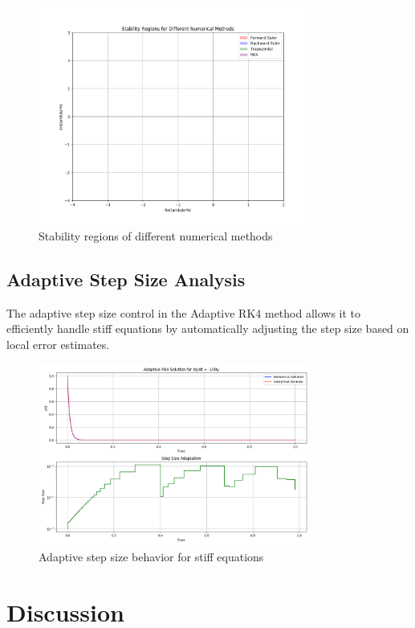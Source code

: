 \documentclass[11pt,a4paper]{article}
\begin{document}
\begin{figure}[H]
    \centering
    \includegraphics[width=0.8\textwidth]{stability_regions.png}
    \caption{Stability regions of different numerical methods}
    \label{fig:stability}
\end{figure}

\subsection{Adaptive Step Size Analysis}

The adaptive step size control in the Adaptive RK4 method allows it to efficiently handle stiff equations by automatically adjusting the step size based on local error estimates.

\begin{figure}[H]
    \centering
    \includegraphics[width=0.8\textwidth]{adaptive_step_size.png}
    \caption{Adaptive step size behavior for stiff equations}
    \label{fig:adaptive_step}
\end{figure}

\section{Discussion}
\end{document}
